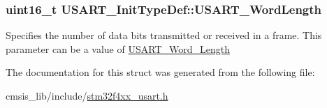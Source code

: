 \subsubsection[{\texorpdfstring{U\+S\+A\+R\+T\+\_\+\+Word\+Length}{USART_WordLength}}]{\setlength{\rightskip}{0pt plus 5cm}uint16\+\_\+t U\+S\+A\+R\+T\+\_\+\+Init\+Type\+Def\+::\+U\+S\+A\+R\+T\+\_\+\+Word\+Length}\hypertarget{struct_u_s_a_r_t___init_type_def_a16d1fb7ccc2b51964f1bcfcbfba6d89d}{}\label{struct_u_s_a_r_t___init_type_def_a16d1fb7ccc2b51964f1bcfcbfba6d89d}
Specifies the number of data bits transmitted or received in a frame. This parameter can be a value of \hyperlink{group___u_s_a_r_t___word___length}{U\+S\+A\+R\+T\+\_\+\+Word\+\_\+\+Length} 

The documentation for this struct was generated from the following file\+:\begin{DoxyCompactItemize}
\item 
cmsis\+\_\+lib/include/\hyperlink{stm32f4xx__usart_8h}{stm32f4xx\+\_\+usart.\+h}\end{DoxyCompactItemize}
